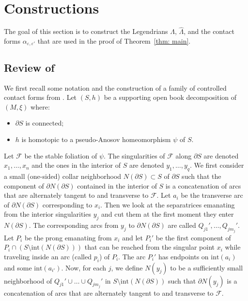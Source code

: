 \documentclass[10pt]{amsart}
\let\mathcal\mathscr
\newcommand{\inte}{\mathrm{int}}
\theoremstyle{plain}
\theoremstyle{definition}
\numberwithin{equation}{subsection}
\newcommand{\cF}{\mathcal{F}}
\newcommand{\bdry}{\partial}
\begin{document}
\section{Constructions}\label{section: constructions}

The goal of this section is to construct the Legendrians $\Lambda$, $\widehat{\Lambda}$, and the contact forms $\alpha_{\varepsilon, \varepsilon'}$ that are used in the proof of Theorem~\ref{thm: main}.

\subsection{Review of \cite{CH2}}

We first recall some notation and the construction of a family of controlled contact forms from \cite{CH2}.
Let $(S,h)$ be a supporting open book decomposition of $(M,\xi)$ where:
\begin{itemize}
\item $\partial S$ is connected;
\item $h$ is homotopic to a pseudo-Anosov homeomorphism $\psi$ of $S$.
\end{itemize}

Let $\cF$ be the stable foliation of $\psi$. The singularities of $\cF$ along $\partial S$ are denoted $x_1,\dots ,x_n$ and the ones in the interior of $S$ are denoted $y_1,\dots ,y_q$. We first consider a small (one-sided) collar neighborhood $N(\bdry S)\subset S$ of $\partial S$ such that the component of $\partial N(\bdry S)$ contained in the interior of $S$ is a concatenation of arcs that are alternately tangent to and transverse to $\cF$. Let $a_i$ be the transverse arc of $\bdry N(\bdry S)$ corresponding to $x_i$. Then we look at the separatrices emanating from the interior singularities $y_j$ and cut them at the first moment they enter $N(\bdry S)$. The corresponding arcs from $y_j$ to $\partial N(\bdry S)$ are called $Q_{j1}', \dots, Q_{jm_j}'$. Let $P_i$ be the prong emanating from $x_i$ and let $P_i'$ be the first component of $P_i\cap (S\setminus\inte(N(\bdry S)))$ that can be reached from the singular point $x_i$ while traveling inside an arc (called $p_i$) of $P_i$. The arc $P_i'$ has endpoints on $\inte(a_i)$ and some $\inte(a_{i'})$. Now, for each $j$, we define $N(y_j)$ to be a sufficiently small neighborhood of $Q_{j1}'\cup \dots\cup Q_{jm_j}'$ in $S\setminus\inte(N(\bdry S))$ such that $\bdry N(y_j)$ is a concatenation of arcs that are alternately tangent to and transverse to $\cF$.
\end{document}
